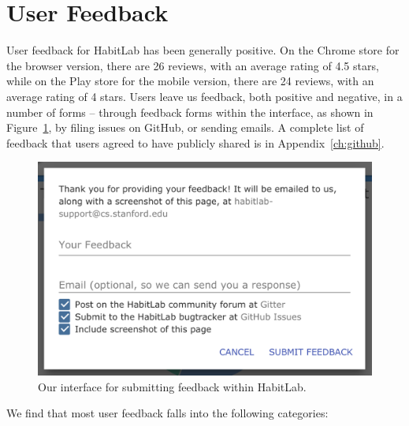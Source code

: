 
\section{User Feedback}


User feedback for HabitLab has been generally positive. On the Chrome store for the browser version, there are 26 reviews, with an average rating of 4.5 stars, while on the Play store for the mobile version, there are 24 reviews, with an average rating of 4 stars. Users leave us feedback, both positive and negative, in a number of forms -- through feedback forms within the interface, as shown in Figure~\ref{fig:feedback_form}, by filing issues on GitHub, or sending emails. A complete list of feedback that users agreed to have publicly shared is in Appendix~\ref{ch:github}.

\begin{figure}
\includegraphics[width=\linewidth]{figuresS/feedback_form}
\caption{Our interface for submitting feedback within HabitLab.}
  \label{fig:feedback_form}
\end{figure}


We find that most user feedback falls into the following categories:

